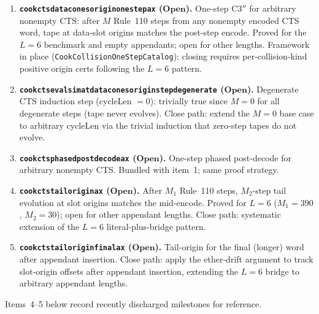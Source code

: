\documentclass[11pt]{article}
\theoremstyle{remark}
\newcommand{\CatOpen}{\textbf{Open}}
\newcommand{\lean}[1]{%
  \penalty-100
  \begingroup\def\_{\textunderscore\allowbreak}\texttt{#1}\endgroup}
\begin{document}
\begin{enumerate}[leftmargin=1.5em]
  \item \textbf{\lean{cook\_cts\_data\_cones\_origin\_one\_step\_ax} ($\CatOpen$).}
    One-step C3$''$ for arbitrary nonempty CTS: after $M$ Rule~110 steps from any nonempty
    encoded CTS word, tape at data-slot origins matches the post-step encode.
    Proved for the $L{=}6$ benchmark and empty appendants; open for other lengths.
    Framework in place (\texttt{CookCollisionOneStepCatalog}); closing requires
    per-collision-kind positive origin certs following the $L{=}6$ pattern.

  \item \textbf{\lean{cook\_cts\_eval\_sim\_at\_data\_cones\_origin\_step\_degenerate} ($\CatOpen$).}
    Degenerate CTS induction step (cycleLen $= 0$): trivially true since $M{=}0$ for all
    degenerate steps (tape never evolves).  Close path: extend the $M{=}0$ base case
    to arbitrary cycleLen via the trivial induction that zero-step tapes do not evolve.

  \item \textbf{\lean{cook\_cts\_phased\_post\_decode\_ax} ($\CatOpen$).}
    One-step phased post-decode for arbitrary nonempty CTS.
    Bundled with item~1; same proof strategy.

  \item \textbf{\lean{cook\_cts\_tail\_origin\_ax} ($\CatOpen$).}
    After $M_1$ Rule~110 steps, $M_2$-step tail evolution at slot origins matches the
    mid-encode.  Proved for $L{=}6$ ($M_1{=}390$, $M_2{=}30$);
    open for other appendant lengths.  Close path: systematic extension of the
    $L{=}6$ literal-plus-bridge pattern.

  \item \textbf{\lean{cook\_cts\_tail\_origin\_final\_ax} ($\CatOpen$).}
    Tail-origin for the final (longer) word after appendant insertion.
    Close path: apply the ether-drift argument to track slot-origin offsets
    after appendant insertion, extending the $L{=}6$ bridge to arbitrary appendant lengths.
\end{enumerate}

Items~4--5 below record recently discharged milestones for reference.
\end{document}
